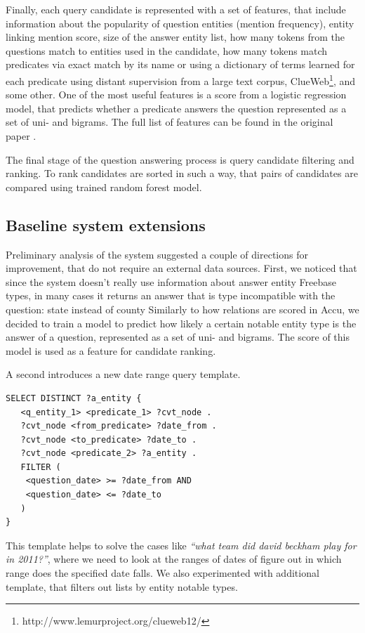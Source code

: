 Finally, each query candidate is represented with a set of features, that include information about the popularity of question entities (mention frequency), entity linking mention score, size of the answer entity list, how many tokens from the questions match to entities used in the candidate, how many tokens match predicates via exact match by its name or using a dictionary of terms learned for each predicate using distant supervision from a large text corpus, \eg ClueWeb\footnote{http://www.lemurproject.org/clueweb12/}, and some other.
One of the most useful features is a score from a logistic regression model, that predicts whether a predicate answers the question represented as a set of uni- and bigrams.
The full list of features can be found in the original paper \cite{ACCU:2015}.

The final stage of the question answering process is query candidate filtering and ranking.
To rank candidates are sorted in such a way, that pairs of candidates are compared using trained random forest model.

\subsection{Baseline system extensions}
Preliminary analysis of the system suggested a couple of directions for improvement, that do not require an external data sources.
First, we noticed that since the system doesn't really use information about answer entity Freebase types, in many cases it returns an answer that is type incompatible with the question: \eg state instead of county \etc
Similarly to how relations are scored in Accu, we decided to train a model to predict how likely a certain notable entity type is the answer of a question, represented as a set of uni- and bigrams.
The score of this model is used as a feature for candidate ranking.

A second introduces a new date range query template.
\begin{lstlisting}[frame=single]
SELECT DISTINCT ?a_entity {
   <q_entity_1> <predicate_1> ?cvt_node .
   ?cvt_node <from_predicate> ?date_from .
   ?cvt_node <to_predicate> ?date_to .
   ?cvt_node <predicate_2> ?a_entity .
   FILTER (
   	<question_date> >= ?date_from AND
   	<question_date> <= ?date_to
   )
}
\end{lstlisting}

This template helps to solve the cases like \textit{``what team did david beckham play for in 2011?''}, where we need to look at the ranges of dates of figure out in which range does the specified date falls.
We also experimented with additional template, that filters out lists by entity notable types.

